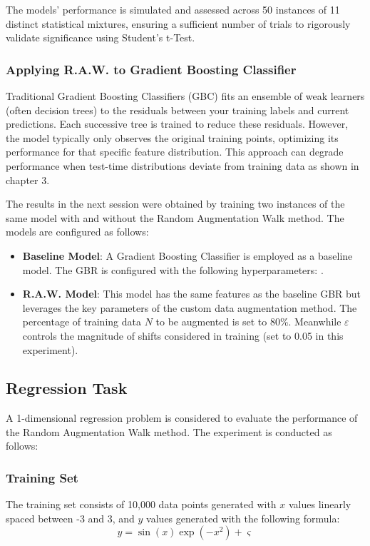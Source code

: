 The models' performance is simulated and assessed across 50 instances of 11 distinct statistical mixtures, ensuring a sufficient number of trials to rigorously validate significance using Student's t-Test.

\subsubsection{Applying R.A.W. to Gradient Boosting Classifier}

Traditional Gradient Boosting Classifiers (GBC) fits an ensemble of weak learners (often decision trees) to the residuals between your training labels and current predictions. Each successive tree is trained to reduce these residuals. However, the model typically only observes the original training points, optimizing its performance for that specific feature distribution. This approach can degrade performance when test-time distributions deviate from training data as shown in chapter 3. 

The results in the next session were obtained by training two instances of the same model with and without the Random Augmentation Walk method. The models are configured as follows:
\begin{itemize}
    \item \textbf{Baseline Model}: A Gradient Boosting Classifier is employed as a baseline model. The GBR is configured with the following hyperparameters: .
    \item \textbf{R.A.W. Model}: This model has the same features as the baseline GBR but leverages the key parameters of the custom data augmentation method. The percentage of training data $N$ to be augmented is set to 80\%. Meanwhile $\varepsilon$ controls the magnitude of shifts considered in training (set to 0.05 in this experiment).
\end{itemize}






\subsection{Regression Task}

A 1-dimensional regression problem is considered to evaluate the performance of the Random Augmentation Walk method. The experiment is conducted as follows:

\subsubsection{Training Set}
The training set consists of 10,000 data points generated with $x$ values linearly spaced between -3 and 3, and $y$ values generated with the following formula:
\begin{equation}
    y = \sin(x)\exp(-x^2) + \varsigma
\end{equation}

